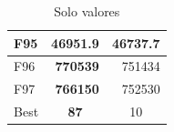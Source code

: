 \begin{table}[]
\begin{tabular}{l|r|r|}
\multicolumn{1}{|l|}{\cellcolor[HTML]{FCE6AB}F95}  & \cellcolor[HTML]{D3FFB6}\textbf{46951.9}                 & 46737.7                                                   \\ \hline
\multicolumn{1}{|l|}{\cellcolor[HTML]{FCE6AB}F96}  & \cellcolor[HTML]{D3FFB6}\textbf{770539}                  & 751434                                                    \\ \hline
\multicolumn{1}{|l|}{\cellcolor[HTML]{FCE6AB}F97}  & \cellcolor[HTML]{D3FFB6}\textbf{766150}                  & 752530                                                    \\ \hline
\multicolumn{1}{|l|}{\cellcolor[HTML]{FFFFC7}Best} & \multicolumn{1}{c|}{\cellcolor[HTML]{D3FFB6}\textbf{87}} & \multicolumn{1}{c|}{10}                                   \\ \hline
\end{tabular}
\caption{Solo valores}
\end{table}

